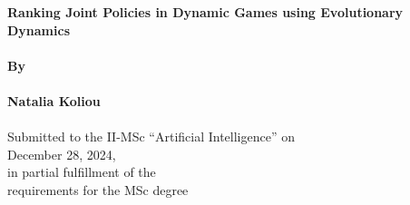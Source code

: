 \begin{center}
    \Large{\textbf{Ranking Joint Policies in Dynamic Games using Evolutionary Dynamics}} \\~\\
    \Large{\textbf{By}} \\~\\
    \Large{\textbf{Natalia Koliou}} \\~\\
    
    \large{Submitted to the II-MSc “Artificial Intelligence” on \\ December 28, 2024, \\ in partial fulfillment of the \\ requirements for the MSc degree \\~\\}
\end{center}

\renewenvironment{abstract}
 {\par\noindent\textbf{\abstractname}\ \ignorespaces}
 {\par\medskip}

